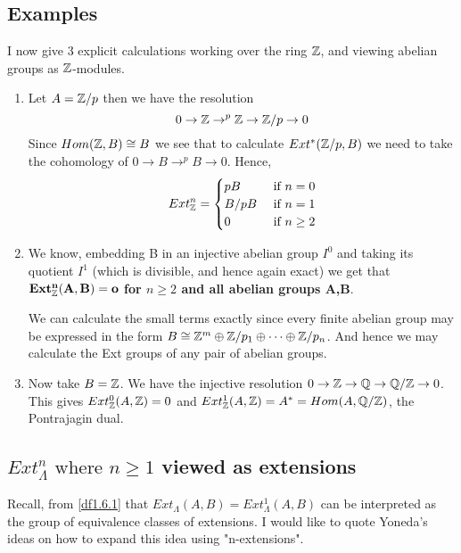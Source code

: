 \subsection{Examples}\label{1.6.3}
I now give 3 explicit calculations working over the ring $\mathbb Z$, and
viewing abelian groups as $\mathbb Z$-modules.
\begin{enumerate}
    \item Let $A=\mathbb Z /p$ then we have the resolution $$0\rightarrow
    \mathbb Z\rightarrow^{p} \mathbb Z\rightarrow \mathbb Z /p\rightarrow 0$$ Since
    $Hom(\mathbb Z,B)\cong B$ we see that to calculate $Ext^*(\mathbb Z/p,B)$ we
    need to take the cohomology of $0\rightarrow B\rightarrow^p
    B\rightarrow  0$. Hence,
    $$Ext_\mathbb Z^n =  \begin{cases}
      pB   &   \text{ if } n=0 \\
      B/{pB} &   \text{ if } n=1 \\
      0    &   \text{ if } n\geq 2 
    \end{cases}$$

    \item We know, embedding B in an injective abelian group $I^0$ and
taking its quotient $I^1$ (which is divisible, and hence again exact)
we get that \\ \textbf{$\mathbf{Ext_\mathbb Z^n (A,B) = o}$ for $n\geq 2$
and all abelian groups A,B}.

We can calculate the small terms exactly since every finite
abelian group may be expressed in the form $B\cong \mathbb Z^m\oplus
\mathbb Z/p_1\oplus \dots \oplus \mathbb Z/p_n$. And hence we may calculate the
Ext groups of any pair of abelian groups.

    \item Now take $B=\mathbb Z$. We have the injective resolution
    $0\rightarrow \mathbb Z\rightarrow \mathbb Q\rightarrow \mathbb Q /\mathbb Z \rightarrow
    0$. This gives $Ext^0_\mathbb Z (A,\mathbb Z) = 0$ and $Ext_\mathbb Z^1 (A,\mathbb Z) =
    A^*= Hom(A,\mathbb Q / \mathbb Z)$, the Pontrajagin dual.
\end{enumerate}

\subsection{$Ext_\Lambda^n\text{ where }n\geq 1$ viewed as extensions}\label{1.6.4}

Recall, from \ref{df1.6.1} that $Ext_\Lambda (A,B) = Ext_\Lambda^1
(A,B)$ can be interpreted as the group of equivalence classes of
extensions. I would like to quote Yoneda's ideas on how to expand
this idea using "n-extensions".

